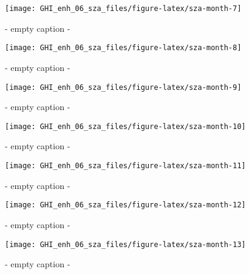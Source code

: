 \documentclass[
  10pt,
  a4paper,oneside]{article}
\begin{document}
\begin{figure}[H]

{\centering \texttt{[image: GHI\_enh\_06\_sza\_files/figure-latex/sza-month-7]} 

}

\caption{ - empty caption - }\label{fig:sza-month-7}
\end{figure}
\begin{figure}[H]

{\centering \texttt{[image: GHI\_enh\_06\_sza\_files/figure-latex/sza-month-8]} 

}

\caption{ - empty caption - }\label{fig:sza-month-8}
\end{figure}
\begin{figure}[H]

{\centering \texttt{[image: GHI\_enh\_06\_sza\_files/figure-latex/sza-month-9]} 

}

\caption{ - empty caption - }\label{fig:sza-month-9}
\end{figure}
\begin{figure}[H]

{\centering \texttt{[image: GHI\_enh\_06\_sza\_files/figure-latex/sza-month-10]} 

}

\caption{ - empty caption - }\label{fig:sza-month-10}
\end{figure}
\begin{figure}[H]

{\centering \texttt{[image: GHI\_enh\_06\_sza\_files/figure-latex/sza-month-11]} 

}

\caption{ - empty caption - }\label{fig:sza-month-11}
\end{figure}
\begin{figure}[H]

{\centering \texttt{[image: GHI\_enh\_06\_sza\_files/figure-latex/sza-month-12]} 

}

\caption{ - empty caption - }\label{fig:sza-month-12}
\end{figure}
\begin{figure}[H]

{\centering \texttt{[image: GHI\_enh\_06\_sza\_files/figure-latex/sza-month-13]} 

}

\caption{ - empty caption - }\label{fig:sza-month-13}
\end{figure}
\end{document}

